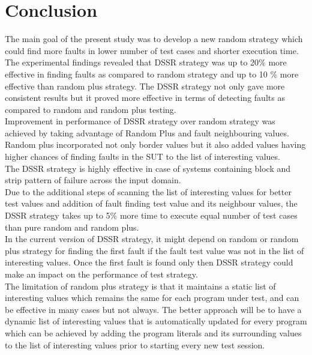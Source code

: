 \documentclass[conference]{IEEEtran}
\begin{document}
\section{Conclusion}
The main goal of the present study was to develop a new random strategy which could find more faults in lower number of test cases and shorter execution time. The experimental findings revealed that DSSR strategy was up to 20\% more effective in finding faults as compared to random strategy and up to 10 \% more effective than random plus strategy. The DSSR strategy not only gave more consistent results but it proved more effective in terms of detecting faults as compared to random and random plus testing.\\
\indent Improvement in performance of DSSR strategy over random strategy was achieved by taking advantage of Random Plus and fault neighbouring values. Random plus incorporated not only border values but it also added values having higher chances of finding faults in the SUT to the list of interesting values.\\
\indent The DSSR strategy is highly effective in case of systems containing block and strip pattern of failure across the input domain.\\
\indent Due to the additional steps of scanning the list of interesting values for better test values and addition of fault finding test value and its neighbour values, the DSSR strategy takes up to 5\% more time to execute equal number of test cases than pure random and random plus. \\
\indent In the current version of DSSR strategy, it might depend on random or random plus strategy for finding the first fault if the fault test value was not in the list of interesting values. Once the first fault is found only then DSSR strategy could make an impact on the performance of test strategy.\\
\indent The limitation of random plus strategy is that it maintains a static list of interesting values which remains the same for each program under test, and can be effective in many cases but not always. The better approach will be to have a dynamic list of interesting values that is automatically updated for every program which can be achieved by adding the program literals and its surrounding values to the list of interesting values prior to starting every new test session.


\end{document}
